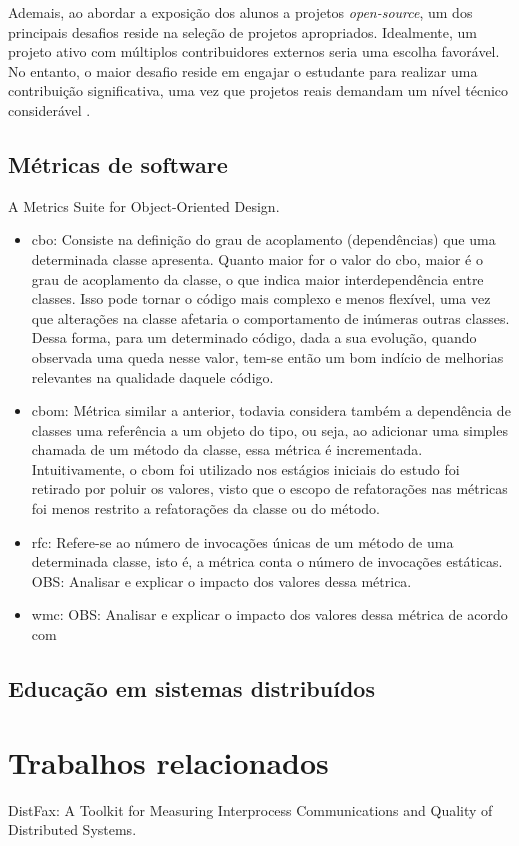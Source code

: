 Ademais, ao abordar a exposição dos alunos a projetos \textit{open-source}, um dos principais desafios reside na seleção de projetos apropriados. Idealmente, um projeto ativo com múltiplos contribuidores externos seria uma escolha favorável. No entanto, o maior desafio reside em engajar o estudante para realizar uma contribuição significativa, uma vez que projetos reais demandam um nível técnico considerável \cite{OSSProjects-TheProfessors'Perspective}. 


\cite{Simone.Tonhao-etal:2022}
\cite{Tiago.Bonetti-etal:2023}

\subsection{Métricas de software}

A Metrics Suite for Object-Oriented Design.
\cite{MetricsSuite}

\begin{itemize}
    \item \gls{cbo}: Consiste na definição do grau de acoplamento (dependências) que uma determinada classe apresenta. Quanto maior for o valor do \gls{cbo}, maior é o grau de acoplamento da classe, o que indica maior interdependência entre classes. Isso pode tornar o código mais complexo e menos flexível, uma vez que alterações na classe afetaria o comportamento de inúmeras outras classes. Dessa forma, para um determinado código, dada a sua evolução, quando observada uma queda nesse valor, tem-se então um bom indício de melhorias relevantes na qualidade daquele código.
    \item \gls{cbom}: Métrica similar a anterior, todavia considera também a dependência de classes uma referência a um objeto do tipo, ou seja, ao adicionar uma simples chamada de um método da classe, essa métrica é incrementada. Intuitivamente, o \gls{cbom} foi utilizado nos estágios iniciais do estudo foi retirado por poluir os valores, visto que o escopo de refatorações nas métricas foi menos restrito a refatorações da classe ou do método.
    \item \gls{rfc}: Refere-se ao número de invocações únicas de um método de uma determinada classe, isto é, a métrica conta o número de invocações estáticas. 
    OBS: Analisar e explicar o impacto dos valores dessa métrica.
    \item \gls{wmc}: OBS: Analisar e explicar o impacto dos valores dessa métrica de acordo com \cite{MetricsSuite}
\end{itemize}

\subsection{Educação em sistemas distribuídos}


\section{Trabalhos relacionados}
\label{section:related-work}

DistFax: A Toolkit for Measuring Interprocess Communications and Quality of Distributed Systems.
\cite{DistFax}
